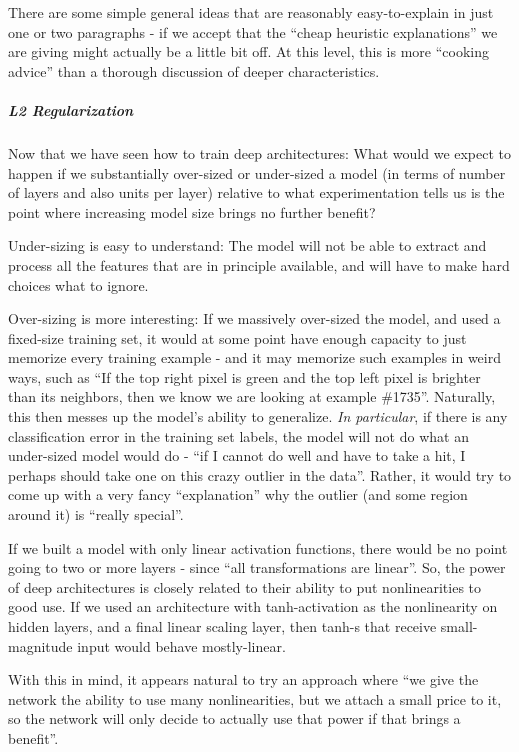 \documentclass[11pt]{article}
\begin{document}
There are some simple general ideas that are reasonably easy-to-explain
in just one or two paragraphs - if we accept that the ``cheap heuristic
explanations'' we are giving might actually be a little bit off. At this
level, this is more ``cooking advice'' than a thorough discussion of
deeper characteristics.

\hypertarget{l2-regularization}{%
\subparagraph{\texorpdfstring{\textbf{L2
Regularization}}{L2 Regularization}}\label{l2-regularization}}

Now that we have seen how to train deep architectures: What would we
expect to happen if we substantially over-sized or under-sized a model
(in terms of number of layers and also units per layer) relative to what
experimentation tells us is the point where increasing model size brings
no further benefit?

Under-sizing is easy to understand: The model will not be able to
extract and process all the features that are in principle available,
and will have to make hard choices what to ignore.

Over-sizing is more interesting: If we massively over-sized the model,
and used a fixed-size training set, it would at some point have enough
capacity to just memorize every training example - and it may memorize
such examples in weird ways, such as ``If the top right pixel is green
and the top left pixel is brighter than its neighbors, then we know we
are looking at example \#1735''. Naturally, this then messes up the
model's ability to generalize. \emph{In particular}, if there is any
classification error in the training set labels, the model will not do
what an under-sized model would do - ``if I cannot do well and have to
take a hit, I perhaps should take one on this crazy outlier in the
data''. Rather, it would try to come up with a very fancy
``explanation'' why the outlier (and some region around it) is ``really
special''.

If we built a model with only linear activation functions, there would
be no point going to two or more layers - since ``all transformations
are linear''. So, the power of deep architectures is closely related to
their ability to put nonlinearities to good use. If we used an
architecture with tanh-activation as the nonlinearity on hidden layers,
and a final linear scaling layer, then tanh-s that receive
small-magnitude input would behave mostly-linear.

With this in mind, it appears natural to try an approach where ``we give
the network the ability to use many nonlinearities, but we attach a
small price to it, so the network will only decide to actually use that
power if that brings a benefit''.
\end{document}
